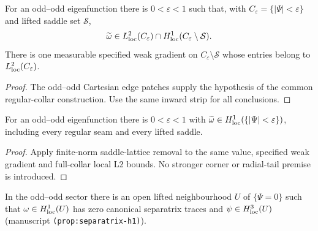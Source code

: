 \begin{lemma}
\label{lem:dd-regular-separatrix-h1}
\leanok
For an odd--odd eigenfunction there is $0<\varepsilon<1$ such that,
with $C_\varepsilon=\{|\Psi|<\varepsilon\}$ and lifted saddle set $\mathcal S$,
\[
 \widetilde\omega\in L^2_{\rm loc}(C_\varepsilon)
 \cap H^1_{\rm loc}(C_\varepsilon\setminus\mathcal S).
\]
There is one measurable specified weak gradient on
$C_\varepsilon\setminus\mathcal S$ whose entries belong to
$L^2_{\rm loc}(C_\varepsilon)$.
\end{lemma}

\begin{proof}
\leanok
The odd--odd Cartesian edge patches supply the hypothesis of the common
regular-collar construction. Use the same inward strip for all conclusions.
\end{proof}

\begin{lemma}
\label{lem:dd-separatrix-vorticity-h1}
\leanok
For an odd--odd eigenfunction there is $0<\varepsilon<1$ with
$\widetilde\omega\in H^1_{\rm loc}(\{|\Psi|<\varepsilon\})$,
including every regular seam and every lifted saddle.
\end{lemma}

\begin{proof}
\leanok
Apply finite-norm saddle-lattice removal to the same value, specified weak
gradient and full-collar local L2 bounds.
No stronger corner or radial-tail premise is introduced.
\end{proof}

\begin{proposition}
\label{prop:dd-separatrix-h1}
\leanok
In the odd--odd sector there is an open lifted neighbourhood $U$ of
$\{\Psi=0\}$ such that $\omega\in H^1_{\rm loc}(U)$ has zero canonical
separatrix traces and $\psi\in H^3_{\rm loc}(U)$
(manuscript \texttt{(prop:separatrix-h1)}).
\end{proposition}

